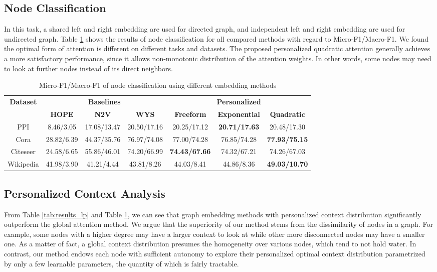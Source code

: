 \documentclass{article}
\begin{document}
\subsection{Node Classification}
In this task, a shared left and right embedding are used for directed graph, and independent left and right embedding are used for undirected graph.
Table \ref{tab:results_nc} shows the results of node classification for all compared methods with regard to Micro-F1/Macro-F1.
We found the optimal form of attention is different on different tasks and datasets. The proposed personalized quadratic attention generally achieves a more satisfactory performance, since it allows non-monotonic distribution of the attention weights. In other words, some nodes may need to look at further nodes instead of its direct neighbors. 

\begin{table}
\caption{Micro-F1/Macro-F1 of node classification using different embedding methods}
\label{tab:results_nc}
\centering
\begin{tabular}{cccc|ccc}
\toprule
\multirow{2}{*}{\textbf{Dataset}} & \multicolumn{3}{c}{\textbf{Baselines}} & \multicolumn{3}{c}{\textbf{Personalized}} \\
 & \textbf{HOPE}  & \textbf{N2V} & \textbf{WYS} & \textbf{Freeform} & \textbf{Exponential} & \textbf{Quadratic}\\
\midrule
PPI & 8.46/3.05 & 17.08/13.47  & 20.50/17.16 & 20.25/17.12 & \textbf{20.71/17.63} & 20.48/17.30\\
Cora & 28.82/6.39 & 44.37/35.76  & 76.97/74.08 & 77.00/74.28 & 76.85/74.28 & \textbf{77.93/75.15}\\
Citeseer & 24.58/6.65  & 55.86/46.01 & 74.20/66.99 & \textbf{74.43/67.66} & 74.32/67.21 & 74.26/67.03\\
Wikipedia & 41.98/3.90  & 41.21/4.44 & 43.81/8.26 & 44.03/8.41 & 44.86/8.36 & \textbf{49.03/10.70}\\

\bottomrule
\end{tabular}
\end{table}


\subsection{Personalized Context Analysis}

From Table \ref{tab:results_lp} and Table \ref{tab:results_nc}, we can see that graph embedding methods with personalized context distribution significantly outperform the global attention method. We argue that the superiority of our method stems from the dissimilarity of nodes in a graph. For example, some nodes with a higher degree may have a larger context to look at while other more disconnected nodes may have a smaller one. As a matter of fact, a global context distribution presumes the homogeneity over various nodes, which tend to not hold water. In contrast, our method endows each node with sufficient autonomy to explore their personalized optimal context distribution parametrized by only a few learnable parameters, the quantity of which is fairly tractable.
\end{document}
